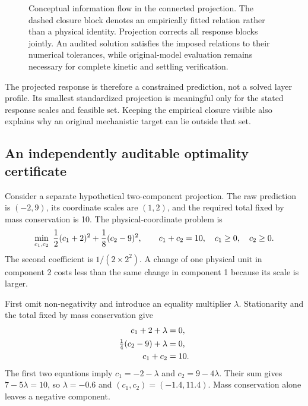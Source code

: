 \begin{figure}[htbp]
\caption{Conceptual information flow in the connected projection. The dashed closure block denotes an empirically fitted relation rather than a physical identity. Projection corrects all response blocks jointly. An audited solution satisfies the imposed relations to their numerical tolerances, while original-model evaluation remains necessary for complete kinetic and settling verification.}
\label{fig:plant_projection_architecture}
\end{figure}

The projected response is therefore a constrained prediction, not a solved layer profile. Its smallest standardized projection is meaningful only for the stated response scales and feasible set. Keeping the empirical closure visible also explains why an original mechanistic target can lie outside that set.

\subsection{An independently auditable optimality certificate}

Consider a separate hypothetical two-component projection. The raw prediction is $(-2,9)$, its coordinate scales are $(1,2)$, and the required total fixed by mass conservation is 10. The physical-coordinate problem is
\begin{equation}
\equationname{Illustrative weighted projection with mass conservation and non-negativity}
\min_{c_1,c_2}\ \frac12(c_1+2)^2+\frac18(c_2-9)^2,
\qquad c_1+c_2=10,\quad c_1\ge0,\quad c_2\ge0.
\end{equation}
The second coefficient is $1/(2\times2^2)$. A change of one physical unit in component 2 costs less than the same change in component 1 because its scale is larger.

First omit non-negativity and introduce an equality multiplier $\lambda$. Stationarity and the total fixed by mass conservation give
\begin{align}
\equationname{Illustrative projection stationarity for the first component}
c_1+2+\lambda&=0,\\
\equationname{Illustrative projection stationarity for the second component}
\tfrac14(c_2-9)+\lambda&=0,\\
\equationname{Illustrative projection equality for the component total}
c_1+c_2&=10.
\end{align}
The first two equations imply $c_1=-2-\lambda$ and $c_2=9-4\lambda$. Their sum gives $7-5\lambda=10$, so $\lambda=-0.6$ and $(c_1,c_2)=(-1.4,11.4)$. Mass conservation alone leaves a negative component.

